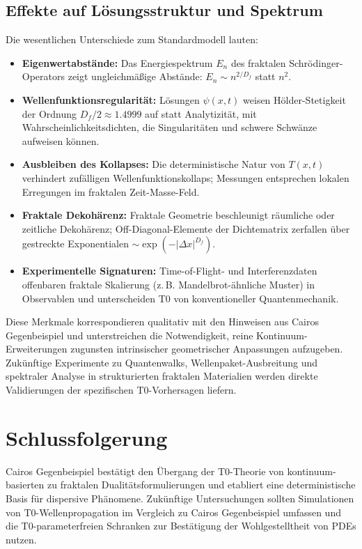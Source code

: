 	\subsection{Effekte auf Lösungsstruktur und Spektrum}
	
	Die wesentlichen Unterschiede zum Standardmodell lauten:
	
	\begin{itemize}
		\item \textbf{Eigenwertabstände:} Das Energiespektrum $E_n$ des fraktalen Schrödinger-Operators zeigt ungleichmäßige Abstände: $E_n \sim n^{2/D_f}$ statt $n^2$.
		\item \textbf{Wellenfunktionsregularität:} Lösungen $\psi(x,t)$ weisen Hölder-Stetigkeit der Ordnung $D_f/2 \approx 1.4999$ auf statt Analytizität, mit Wahrscheinlichkeitsdichten, die Singularitäten und schwere Schwänze aufweisen können.
		\item \textbf{Ausbleiben des Kollapses:} Die deterministische Natur von $T(x,t)$ verhindert zufälligen Wellenfunktionskollaps; Messungen entsprechen lokalen Erregungen im fraktalen Zeit-Masse-Feld.
		\item \textbf{Fraktale Dekohärenz:} Fraktale Geometrie beschleunigt räumliche oder zeitliche Dekohärenz; Off-Diagonal-Elemente der Dichtematrix zerfallen über gestreckte Exponentialen $\sim \exp(-|\Delta x|^{D_f})$.
		\item \textbf{Experimentelle Signaturen:} Time-of-Flight- und Interferenzdaten offenbaren fraktale Skalierung (z.\,B. Mandelbrot-ähnliche Muster) in Observablen und unterscheiden T0 von konventioneller Quantenmechanik.
	\end{itemize}
	
	Diese Merkmale korrespondieren qualitativ mit den Hinweisen aus Cairos Gegenbeispiel und unterstreichen die Notwendigkeit, reine Kontinuum-Erweiterungen zugunsten intrinsischer geometrischer Anpassungen aufzugeben. Zukünftige Experimente zu Quantenwalks, Wellenpaket-Ausbreitung und spektraler Analyse in strukturierten fraktalen Materialien werden direkte Validierungen der spezifischen T0-Vorhersagen liefern.
	
	\section{Schlussfolgerung}
	
	Cairos Gegenbeispiel bestätigt den Übergang der T0-Theorie von kontinuum-basierten zu fraktalen Dualitätsformulierungen und etabliert eine deterministische Basis für dispersive Phänomene. Zukünftige Untersuchungen sollten Simulationen von T0-Wellenpropagation im Vergleich zu Cairos Gegenbeispiel umfassen und die T0-parameterfreien Schranken zur Bestätigung der Wohlgestelltheit von PDEs nutzen.
	
